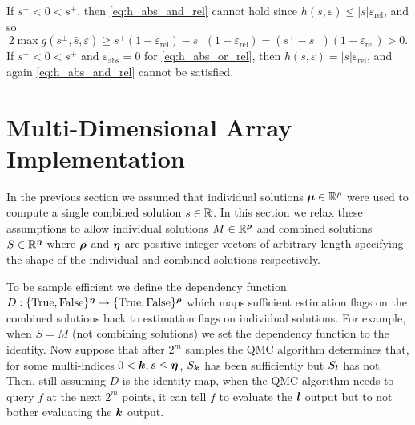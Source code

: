 \documentclass{article}[12pt]
\newcommand{\varepsabs}{\varepsilon_\text{abs}}
\newcommand{\varepsrel}{\varepsilon_\text{rel}}
\begin{document}
If $s^- < 0 < s^+$, then \eqref{eq:h_abs_and_rel} cannot hold since $h(s,\varepsilon) \le \lvert s \rvert \varepsrel$, and so
\begin{equation}
2 \max g(s^\pm,\hat{s},\varepsilon) \ge s^+ (1 - \varepsrel) - s^- (1  - \varepsrel) = (s^+ - s^-)(1 - \varepsrel) > 0.
\end{equation}
If $s^- < 0 < s^+$ and $\varepsabs = 0$ for \eqref{eq:h_abs_or_rel}, then $h(s,\varepsilon) = \lvert s \rvert \varepsrel$, and again \eqref{eq:h_abs_and_rel} cannot be satisfied.

\section{Multi-Dimensional Array Implementation} \label{sec: Vectorized Implementation}

In the previous section we assumed that individual solutions $\boldsymbol{\mu} \in \mathbb{R}^\rho$ were used to compute a single combined solution $s \in \mathbb{R}$. In this section we relax these assumptions to allow individual solutions $M \in \mathbb{R}^{\boldsymbol{\rho}}$ and combined solutions $S \in \mathbb{R}^{\boldsymbol{\eta}}$ where $\boldsymbol{\rho}$ and $\boldsymbol{\eta}$ are positive integer vectors of arbitrary length specifying the shape of the individual and combined solutions respectively. 

To be sample efficient we define the dependency function $D: \{\text{True},\text{False}\}^{\boldsymbol{\eta}} \to \{\text{True},\text{False}\}^{\boldsymbol{\rho}}$ which maps sufficient estimation flags on the combined solutions back to estimation flags on individual solutions. For example, when $S = M$ (not combining solutions) we set the dependency function to the identity. Now suppose that after $2^m$ samples the QMC algorithm determines that, for some multi-indices $0 < \boldsymbol{k},\boldsymbol{s} \leq \boldsymbol{\eta}$, $S_{\boldsymbol{k}}$ has been sufficiently but $S_{\boldsymbol{l}}$ has not. Then, still assuming $D$ is the identity map, when the QMC algorithm needs to query $f$ at the next $2^m$ points, it can tell $f$ to evaluate the ${\boldsymbol{l}}$ output but to not bother evaluating the ${\boldsymbol{k}}$ output.
\end{document}
